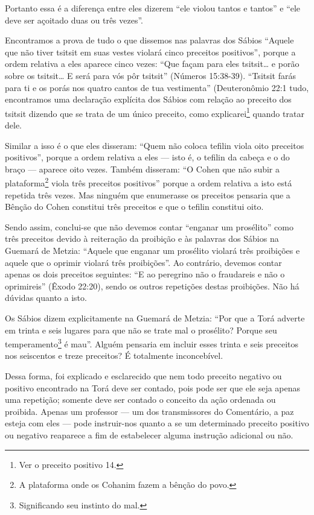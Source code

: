 Portanto essa é a diferença entre eles dizerem ``ele violou tantos e
tantos'' e ``ele deve ser açoitado duas ou três vezes''.

Encontramos a prova de tudo o que dissemos nas palavras dos Sábios
``Aquele que não tiver tsitsit em suas vestes violará cinco preceitos
positivos'', porque a ordem relativa a eles aparece cinco vezes: ``Que
façam para eles tsitsit\ldots{} e porão sobre os tsitsit\ldots{} E será para
vós pôr tsitsit'' (Números 15:38-39). ``Tsitsit farás para ti e os
porás nos quatro cantos de tua vestimenta'' (Deuteronômio 22:1 tudo,
encontramos uma declaração explícita dos Sábios com relação ao preceito
dos tsitsit dizendo que se trata de um único preceito, como
explicarei\footnote{Ver o preceito positivo 14.} quando tratar dele.


Similar a isso é o que eles disseram: ``Quem não coloca tefilin viola oito preceitos positivos'', porque a ordem relativa a eles --- isto
é, o tefilin da cabeça e o do braço --- aparece oito vezes. Também disseram:
``O Cohen que não subir a plataforma\footnote{A plataforma onde os Cohanim fazem a bênção do povo.} viola três
preceitos positivos'' porque a ordem relativa a isto está repetida três vezes. Mas ninguém que enumerasse os
preceitos pensaria que a Bênção do Cohen constitui três preceitos e
que o tefilin constitui oito.

Sendo assim, conclui-se que não devemos contar ``enganar um prosélito''
como três preceitos devido à reiteração da proibição e às palavras dos
Sábios na Guemará de Metzia: ``Aquele que enganar um prosélito violará
três proibições e aquele que o oprimir violará três proibições''. Ao
contrário, devemos contar apenas os dois preceitos seguintes: ``E ao
peregrino não o fraudareis e não o oprimireis'' (Êxodo 22:20), sendo os
outros repetições destas proibições. Não há dúvidas quanto a isto.

Os Sábios dizem explicitamente na Guemará de Metzia: ``Por que a
Torá adverte em trinta e seis lugares para que não se trate mal o
prosélito?
Porque seu temperamento\footnote{Significando seu instinto do mal.} é mau''. Alguém pensaria em incluir esses trinta e seis preceitos nos seiscentos e treze preceitos? É totalmente inconcebível.



Dessa forma, foi explicado e esclarecido que nem todo preceito negativo
ou positivo encontrado na Torá deve ser contado, pois pode ser que ele
seja apenas uma repetição; somente deve ser contado o conceito da ação
ordenada ou proibida. Apenas um professor --- um dos transmissores do
Comentário, a paz esteja com eles --- pode instruir-nos quanto a se um
determinado preceito positivo ou negativo reaparece a fim de
estabelecer alguma instrução adicional ou não.

